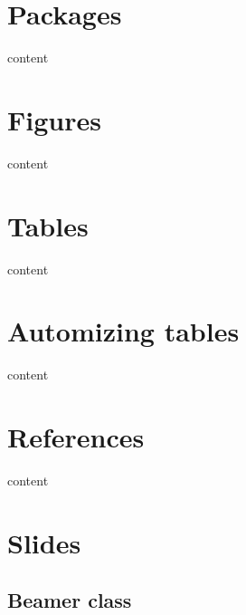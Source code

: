 \documentclass[ignorenonframetext]{beamer}
\begin{document}
\section{Packages}

\begin{frame}
	content
\end{frame}

\section{Figures}

\begin{frame}
	content
\end{frame}

\section{Tables}

\begin{frame}
	content
\end{frame}

\section{Automizing tables}

\begin{frame}
	content
\end{frame}

\section{References}

\begin{frame}
	content
\end{frame}

\section{Slides}

\subsection{Beamer class}

\end{document}
